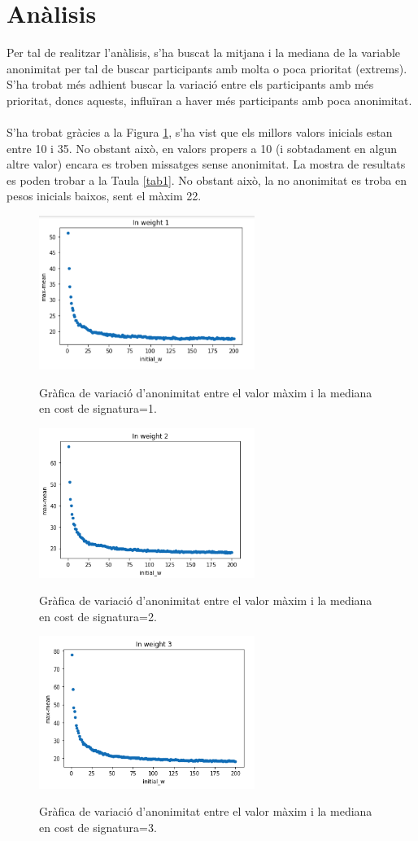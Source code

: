 \documentclass{article}
\begin{document}
\section{Anàlisis}
Per tal de realitzar l'anàlisis, s'ha buscat la mitjana i la mediana de la variable anonimitat per tal de buscar participants amb molta o poca prioritat (extrems). S'ha trobat més adhient buscar la variació entre els participants amb més prioritat, doncs aquests, influïran a haver més participants amb poca anonimitat.
\\
\\
S'ha trobat gràcies a la Figura \ref{fig:weight1}, s'ha vist que els millors valors inicials estan entre 10 i 35. No obstant això, en valors propers a 10 (i sobtadament en algun altre valor) encara es troben missatges sense anonimitat. La mostra de resultats es poden trobar a la Taula \ref{tab1}. No obstant això, la no anonimitat es troba en pesos inicials baixos, sent el màxim 22.
\begin{figure}[H]
	\centering
	\includegraphics[width=7cm]{imgs/weight1.png}
	\label{fig:weight1}
	\caption{Gràfica de variació d'anonimitat entre el valor màxim i la mediana en cost de signatura=1.}
\end{figure}
\begin{figure}[H]
	\centering
	\includegraphics[width=7cm]{imgs/weight2.png}
	\label{fig:weight2}
	\caption{Gràfica de variació d'anonimitat entre el valor màxim i la mediana en cost de signatura=2.}
\end{figure}
\begin{figure}[H]
	\centering
	\includegraphics[width=7cm]{imgs/weight3.png}
	\label{fig:weight3}
	\caption{Gràfica de variació d'anonimitat entre el valor màxim i la mediana en cost de signatura=3.}
\end{figure}
\end{document}
